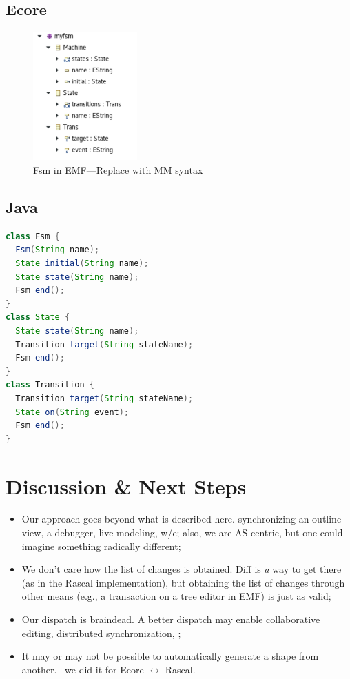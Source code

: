\documentclass[sigplan]{acmart}
\begin{document}
\subsection{Ecore}
\begin{figure}
	\includegraphics[width=4cm]{figures/fsm-ecore.pdf}
	\caption{Fsm in EMF---Replace with MM syntax}
	\label{fig:fsmEcore}
\end{figure}

\subsection{Java}
\begin{minipage}{\columnwidth}
\begin{lstlisting}[label=lst:fsm-api, caption={FSM in Fluent API}, language=Java]
class Fsm {
  Fsm(String name);
  State initial(String name);
  State state(String name);
  Fsm end();
}
class State {
  State state(String name);
  Transition target(String stateName);
  Fsm end();
}
class Transition {
  Transition target(String stateName);
  State on(String event);
  Fsm end();
}
\end{lstlisting}
\end{minipage}

\section{Discussion \& Next Steps}
\begin{itemize}
	\item Our approach goes beyond what is described here. \eg synchronizing an outline view, a debugger, live modeling, w/e; also, we are AS-centric, but one could imagine something radically different;
	\item We don’t care how the list of changes is obtained. Diff is \emph{a} way to get there (as in the Rascal implementation), but obtaining the list of changes through other means (e.g., a transaction on a tree editor in EMF) is just as valid;
	\item Our dispatch is braindead. A better dispatch may enable collaborative editing, distributed synchronization, \etc;
	\item It may or may not be possible to automatically generate a shape from another. \eg~we did it for Ecore $\leftrightarrow$ Rascal.
\end{itemize}

\clearpage
\balance


\end{document}
